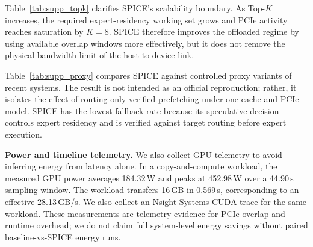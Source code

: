 Table~\ref{tab:supp_topk} clarifies SPICE's scalability boundary. As Top-$K$
increases, the required expert-residency working set grows and PCIe activity
reaches saturation by $K{=}8$. SPICE therefore improves the offloaded regime by
using available overlap windows more effectively, but it does not remove the
physical bandwidth limit of the host-to-device link.

\begin{table}[t]
\centering
\caption{Controlled proxy comparison with recent MoE inference systems.}
\label{tab:supp_proxy}
\scriptsize
{}
\end{table}

Table~\ref{tab:supp_proxy} compares SPICE against controlled proxy variants of
recent systems. The result is not intended as an official reproduction; rather,
it isolates the effect of routing-only verified prefetching under one cache and
PCIe model. SPICE has the lowest fallback rate because its speculative decision
controls expert residency and is verified against target routing before expert
execution.

\textbf{Power and timeline telemetry.}
We also collect GPU telemetry to avoid inferring energy from latency alone. In a
copy-and-compute workload, the measured GPU power averages 184.32\,W and peaks
at 452.98\,W over a 44.90\,s sampling window. The workload transfers 16\,GB in
0.569\,s, corresponding to an effective 28.13\,GB/s. We also collect an Nsight
Systems CUDA trace for the same workload. These measurements are telemetry
evidence for PCIe overlap and runtime overhead; we do not claim full
system-level energy savings without paired baseline-vs-SPICE energy runs.

